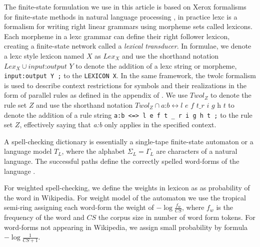 \documentclass[a4paper,runningheads]{llncs}
\begin{document}
The finite-state formulation we use in this article is based on Xerox
formalisms for finite-state methods in natural language processing
\cite{beesley/2003}, in practice lexc is a formalism for writing right linear
grammars using morpheme sets called lexicons. Each morpheme in a lexc grammar
can define their right follower lexicon, creating a finite-state network called
a \emph{lexical transducer}. In formulae, we denote a lexc style lexicon named $X$ as
$Lex_X$ and use the shorthand notation $Lex_X \cup \textit{input:output Y}$ to
denote the addition of a lexc string or morpheme, \texttt{input:output Y ;} to
the \texttt{LEXICON X}.  In the same framework, the twolc formalism is used to
describe context restrictions for symbols and their realizations in the form of
parallel rules as defined in the appendix of \cite{beesley/2003}. We use
$Twol_Z$ to denote the rule set $Z$ and use the shorthand notation $Twol_Z \cap
\textit{a:b} \leftrightarrow \textit{l e f t} \_ \textit{r i g h t}$ to denote
the addition of a rule string \texttt{a:b <=> l e f t \_ r i g h t ;} to the
rule set $Z$, effectively saying that \textit{a:b} only applies in
the specified context.

A spell-checking dictionary is essentially a single-tape finite-state
automaton or a language model $T_L$, where the alphabet $\Sigma_L =
\Gamma_L$ are characters of a natural language. The successful paths
define the correctly spelled word-forms of the language
\cite{conf/lrec/Pirinen2010}. 

For weighted spell-checking, we define the weights in lexicon as
as probability of the word in Wikipedia. For weight model of the automaton
we use the tropical semi-ring assigning each word-form the weight of
$-\log \frac{f_w}{CS}$, where $f_w$ is the frequency of the word and $CS$
the corpus size in number of word form tokens. For word-forms not appearing
in Wikipedia, we assign small probability by formula $-\log \frac{1}{CS+1}$.
\end{document}
